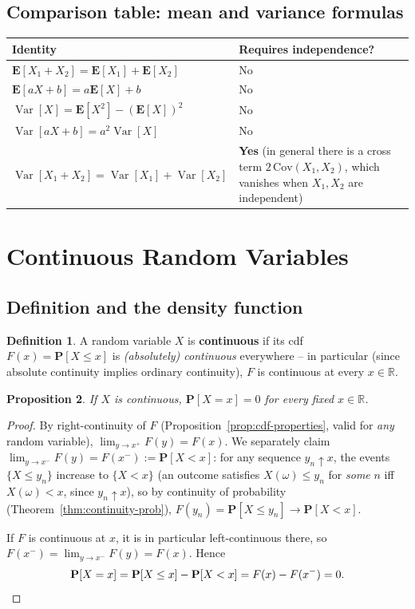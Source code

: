 \documentclass[11pt]{article}
\theoremstyle{definition}
\newtheorem{definition}{Definition}[section]
\theoremstyle{plain}
\newtheorem{proposition}[definition]{Proposition}
\theoremstyle{remark}
\newcommand{\E}[1]{\mathbf{E}\!\left[#1\right]}
\newcommand{\Var}[1]{\operatorname{Var}\!\left[#1\right]}
\newcommand{\R}{\mathbb{R}}
\begin{document}
\subsection{Comparison table: mean and variance formulas}

\begin{center}
\renewcommand{\arraystretch}{1.5}
\begin{longtable}{p{6.5cm} p{5.5cm}}
\toprule
\textbf{Identity} & \textbf{Requires independence?} \\
\midrule
$\E{X_1+X_2} = \E{X_1}+\E{X_2}$ & No \\
$\E{aX+b}=a\E{X}+b$ & No \\
$\Var{X}=\E{X^2}-(\E{X})^2$ & No \\
$\Var{aX+b} = a^2\Var{X}$ & No \\
$\Var{X_1+X_2} = \Var{X_1}+\Var{X_2}$ & \textbf{Yes} (in general there is a cross term
$2\,\mathrm{Cov}(X_1,X_2)$, which vanishes when $X_1,X_2$ are independent) \\
\bottomrule
\end{longtable}
\end{center}

\newpage
\section{Continuous Random Variables}

\subsection{Definition and the density function}

\begin{definition}
A random variable $X$ is \textbf{continuous} if its cdf $F(x)=\mathbf{P}[X\le x]$ is
\emph{(absolutely) continuous} everywhere -- in particular (since absolute continuity implies
ordinary continuity), $F$ is continuous at every $x \in \R$.
\end{definition}

\begin{proposition}
If $X$ is continuous, $\mathbf{P}[X=x]=0$ for every fixed $x\in\R$.
\end{proposition}
\begin{proof}
By right-continuity of $F$ (Proposition~\ref{prop:cdf-properties}, valid for \emph{any} random
variable), $\lim_{y\to x^+}F(y)=F(x)$. We separately claim $\lim_{y\to x^-}F(y) = F(x^-) :=
\mathbf{P}[X<x]$: for any sequence $y_n \uparrow x$, the events $\{X\le y_n\}$ increase to
$\{X<x\}$ (an outcome satisfies $X(\omega)\le y_n$ for \emph{some} $n$ iff $X(\omega)<x$, since
$y_n\uparrow x$), so by continuity of probability (Theorem~\ref{thm:continuity-prob}),
$F(y_n)=\mathbf{P}[X\le y_n]\to \mathbf{P}[X<x]$.

If $F$ is continuous at $x$, it is in particular left-continuous there, so
$F(x^-) = \lim_{y\to x^-}F(y) = F(x)$. Hence
\[
\mathbf{P}[X=x] = \mathbf{P}[X\le x] - \mathbf{P}[X<x] = F(x)-F(x^-) = 0. \qedhere
\]
\end{proof}
\end{document}

